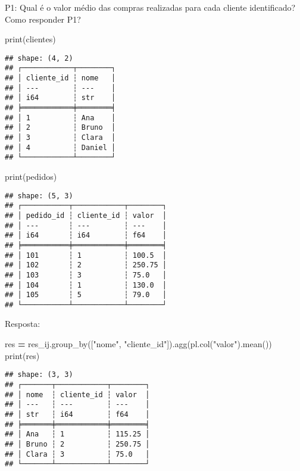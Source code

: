 \documentclass[
]{article}
\newenvironment{Shaded}{\begin{snugshade}}{\end{snugshade}}
\newcommand{\BuiltInTok}[1]{#1}
\newcommand{\NormalTok}[1]{#1}
\newcommand{\OperatorTok}[1]{\textcolor[rgb]{0.81,0.36,0.00}{\textbf{#1}}}
\newcommand{\StringTok}[1]{\textcolor[rgb]{0.31,0.60,0.02}{#1}}
\begin{document}
P1: Qual é o valor médio das compras realizadas para cada cliente
identificado? Como responder P1?

\begin{Shaded}
\begin{Highlighting}[]
\BuiltInTok{print}\NormalTok{(clientes)}
\end{Highlighting}
\end{Shaded}

\begin{verbatim}
## shape: (4, 2)
## ┌────────────┬────────┐
## │ cliente_id ┆ nome   │
## │ ---        ┆ ---    │
## │ i64        ┆ str    │
## ╞════════════╪════════╡
## │ 1          ┆ Ana    │
## │ 2          ┆ Bruno  │
## │ 3          ┆ Clara  │
## │ 4          ┆ Daniel │
## └────────────┴────────┘
\end{verbatim}

\begin{Shaded}
\begin{Highlighting}[]
\BuiltInTok{print}\NormalTok{(pedidos)}
\end{Highlighting}
\end{Shaded}

\begin{verbatim}
## shape: (5, 3)
## ┌───────────┬────────────┬────────┐
## │ pedido_id ┆ cliente_id ┆ valor  │
## │ ---       ┆ ---        ┆ ---    │
## │ i64       ┆ i64        ┆ f64    │
## ╞═══════════╪════════════╪════════╡
## │ 101       ┆ 1          ┆ 100.5  │
## │ 102       ┆ 2          ┆ 250.75 │
## │ 103       ┆ 3          ┆ 75.0   │
## │ 104       ┆ 1          ┆ 130.0  │
## │ 105       ┆ 5          ┆ 79.0   │
## └───────────┴────────────┴────────┘
\end{verbatim}

Resposta:

\begin{Shaded}
\begin{Highlighting}[]
\NormalTok{res }\OperatorTok{=}\NormalTok{ res\_ij.group\_by([}\StringTok{"nome"}\NormalTok{, }\StringTok{"cliente\_id"}\NormalTok{]).agg(pl.col(}\StringTok{"valor"}\NormalTok{).mean())}
\BuiltInTok{print}\NormalTok{(res)}
\end{Highlighting}
\end{Shaded}

\begin{verbatim}
## shape: (3, 3)
## ┌───────┬────────────┬────────┐
## │ nome  ┆ cliente_id ┆ valor  │
## │ ---   ┆ ---        ┆ ---    │
## │ str   ┆ i64        ┆ f64    │
## ╞═══════╪════════════╪════════╡
## │ Ana   ┆ 1          ┆ 115.25 │
## │ Bruno ┆ 2          ┆ 250.75 │
## │ Clara ┆ 3          ┆ 75.0   │
## └───────┴────────────┴────────┘
\end{verbatim}
\end{document}
